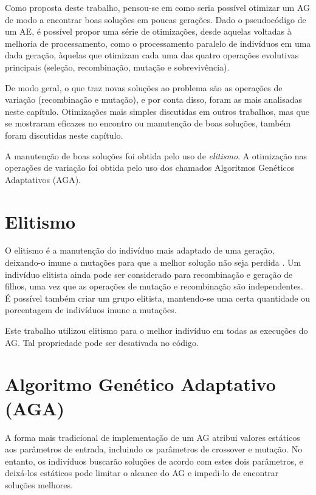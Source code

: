 \label{4_otimizacao}

Como proposta deste trabalho, pensou-se em como seria possível otimizar um AG de modo a encontrar boas soluções em poucas gerações. Dado o pseudocódigo de um AE, é possível propor uma série de otimizações, desde aquelas voltadas à melhoria de processamento, como o processamento paralelo de indivíduos em uma dada geração, àquelas que otimizam cada uma das quatro operações evolutivas principais (seleção, recombinação, mutação e sobrevivência).

De modo geral, o que traz novas soluções ao problema são as operações de variação (recombinação e mutação), e por conta disso, foram as mais analisadas neste capítulo. Otimizações mais simples discutidas em outros trabalhos, mas que se mostraram eficazes no encontro ou manutenção de boas soluções, também foram discutidas neste capítulo.

A manutenção de boas soluções foi obtida pelo uso de \emph{elitismo}. A otimização nas operações de variação foi obtida pelo uso dos chamados Algoritmos Genéticos Adaptativos (AGA).

\section{Elitismo}

O elitismo é a manutenção do indivíduo mais adaptado de uma geração, deixando-o imune a mutações para que a melhor solução não seja perdida \cite{mitchell1998introduction}. Um indivíduo elitista ainda pode ser considerado para recombinação e geração de filhos, uma vez que as operações de mutação e recombinação são independentes. É possível também criar um grupo elitista, mantendo-se uma certa quantidade ou porcentagem de indivíduos imune a mutações.

Este trabalho utilizou elitismo para o melhor indivíduo em todas as execuções do AG. Tal propriedade pode ser desativada no código.

\section{Algoritmo Genético Adaptativo (AGA)}

A forma mais tradicional de implementação de um AG atribui valores estáticos aos parâmetros de entrada, incluindo os parâmetros de crossover e mutação. No entanto, os indivíduos buscarão soluções de acordo com estes dois parâmetros, e deixá-los estáticos pode limitar o alcance do AG e impedi-lo de encontrar soluções melhores.

